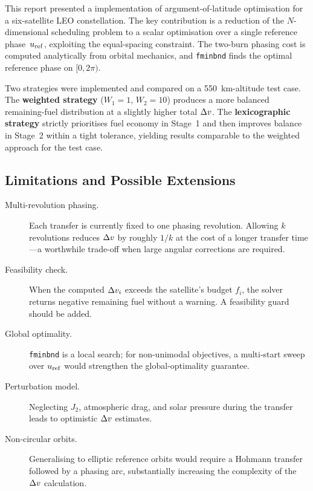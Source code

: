 This report presented a \MATLAB{} implementation of argument-of-latitude
optimisation for a six-satellite LEO constellation. The key contribution
is a reduction of the $N$-dimensional scheduling problem to a scalar
optimisation over a single reference phase~$u_\mathrm{ref}$, exploiting the
equal-spacing constraint. The two-burn phasing cost is computed
analytically from orbital mechanics, and \texttt{fminbnd} finds the
optimal reference phase on $[0,2\pi)$.

Two strategies were implemented and compared on a 550~km-altitude test
case. The \textbf{weighted strategy} ($W_1=1$, $W_2=10$) produces a
more balanced remaining-fuel distribution at a slightly higher total $\Delta v$.
The \textbf{lexicographic strategy} strictly prioritises fuel economy in
Stage~1 and then improves balance in Stage~2 within a tight tolerance,
yielding results comparable to the weighted approach for the test case.

\subsection{Limitations and Possible Extensions}

\begin{description}
  \item[Multi-revolution phasing.]
    Each transfer is currently fixed to one phasing revolution. Allowing
    $k$ revolutions reduces $\Delta v$ by roughly $1/k$ at the cost of a
    longer transfer time---a worthwhile trade-off when large angular
    corrections are required.

  \item[Feasibility check.]
    When the computed $\Delta v_i$ exceeds the satellite's budget $f_i$,
    the solver returns negative remaining fuel without a warning.
    A feasibility guard should be added.

  \item[Global optimality.]
    \texttt{fminbnd} is a local search; for non-unimodal objectives,
    a multi-start sweep over $u_\mathrm{ref}$ would strengthen the global-optimality
    guarantee.

  \item[Perturbation model.]
    Neglecting $J_2$, atmospheric drag, and solar pressure during the
    transfer leads to optimistic $\Delta v$ estimates.

  \item[Non-circular orbits.]
    Generalising to elliptic reference orbits would require a Hohmann
    transfer followed by a phasing arc, substantially increasing the
    complexity of the $\Delta v$ calculation.
\end{description}
